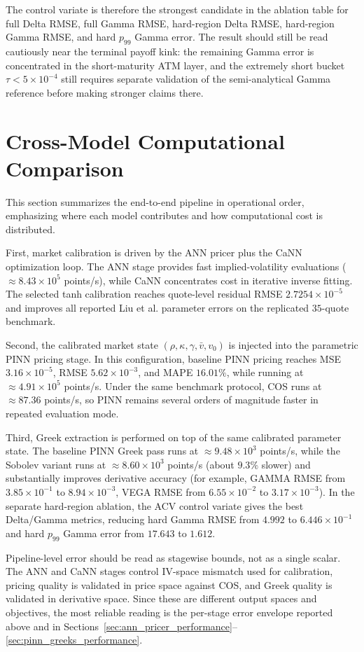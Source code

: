 The control variate is therefore the strongest candidate in the ablation table for full Delta RMSE, full Gamma RMSE, hard-region Delta RMSE, hard-region Gamma RMSE, and hard \(p_{99}\) Gamma error. The result should still be read cautiously near the terminal payoff kink: the remaining Gamma error is concentrated in the short-maturity ATM layer, and the extremely short bucket \(\tau<5\times10^{-4}\) still requires separate validation of the semi-analytical Gamma reference before making stronger claims there.

\section{Cross-Model Computational Comparison}
\label{sec:cross_model_computational_comparison}
This section summarizes the end-to-end pipeline in operational order, emphasizing where each model contributes and how computational cost is distributed.

First, market calibration is driven by the ANN pricer plus the CaNN optimization loop. The ANN stage provides fast implied-volatility evaluations (\(\approx 8.43\times10^5\) points/s), while CaNN concentrates cost in iterative inverse fitting. The selected tanh calibration reaches quote-level residual RMSE \(2.7254\times10^{-5}\) and improves all reported Liu et al. parameter errors on the replicated \(35\)-quote benchmark.

Second, the calibrated market state \((\rho,\kappa,\gamma,\bar v,v_0)\) is injected into the parametric PINN pricing stage. In this configuration, baseline PINN pricing reaches MSE \(3.16\times10^{-5}\), RMSE \(5.62\times10^{-3}\), and MAPE \(16.01\%\), while running at \(\approx 4.91\times10^5\) points/s. Under the same benchmark protocol, COS runs at \(\approx 87.36\) points/s, so PINN remains several orders of magnitude faster in repeated evaluation mode.

Third, Greek extraction is performed on top of the same calibrated parameter state. The baseline PINN Greek pass runs at \(\approx 9.48\times10^3\) points/s, while the Sobolev variant runs at \(\approx 8.60\times10^3\) points/s (about \(9.3\%\) slower) and substantially improves derivative accuracy (for example, GAMMA RMSE from \(3.85\times10^{-1}\) to \(8.94\times10^{-3}\), VEGA RMSE from \(6.55\times10^{-2}\) to \(3.17\times10^{-3}\)). In the separate hard-region ablation, the ACV control variate gives the best Delta/Gamma metrics, reducing hard Gamma RMSE from \(4.992\) to \(6.446\times10^{-1}\) and hard \(p_{99}\) Gamma error from \(17.643\) to \(1.612\).

Pipeline-level error should be read as stagewise bounds, not as a single scalar. The ANN and CaNN stages control IV-space mismatch used for calibration, pricing quality is validated in price space against COS, and Greek quality is validated in derivative space. Since these are different output spaces and objectives, the most reliable reading is the per-stage error envelope reported above and in Sections~\ref{sec:ann_pricer_performance}--\ref{sec:pinn_greeks_performance}.
